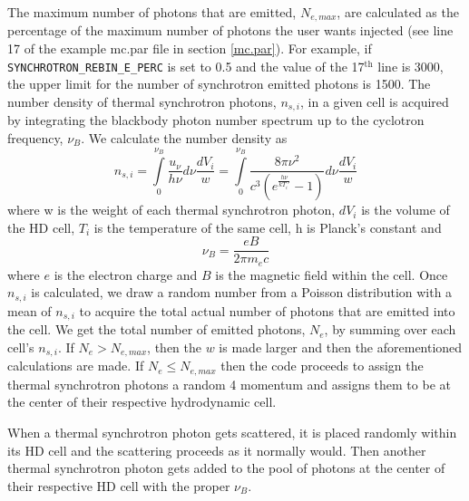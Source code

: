 \documentclass[12pt,a4paper]{article}
\begin{document}
The maximum number of photons that are emitted, $N_{e,max}$, are calculated as the percentage of the maximum number of photons the user wants injected (see line 17 of the example mc.par file in section \ref{mc.par}). For example, if \texttt{SYNCHROTRON\_REBIN\_E\_PERC} is set to 0.5 and the value of the 17$^\textrm{th}$ line is 3000, the upper limit for the number of synchrotron emitted photons is 1500. The number density of thermal synchrotron photons, $n_{s,i}$, in a given cell is acquired by integrating the blackbody photon number spectrum up to the cyclotron frequency, $\nu_B$. We calculate the number density as
\begin{equation}
n_{s,i}=\int\limits_{0}^{\nu_B}\frac{u_\nu}{h \nu}d\nu\frac{dV_i}{w}=\int\limits_{0}^{\nu_B}\frac{8\pi \nu^2 }{c^3 (e^\frac{h\nu}{kT_i'}-1 )}d\nu\frac{dV_i}{w}
\end{equation}
 where w is the weight of each thermal synchrotron photon, $dV_i$ is the volume of the HD cell, $T_i$ is the temperature of the same cell, h is Planck's constant and 
\begin{equation}
\nu_B=\frac{eB}{2\pi m_e c}
\end{equation}
where $e$ is the electron charge and $B$ is the magnetic field within the cell. Once $n_{s,i}$ is calculated, we draw a random number from a Poisson distribution with a mean of $n_{s,i}$ to acquire the total actual number of photons that are emitted into the cell. We get the total number of emitted photons, $N_e$, by summing over each cell's $n_{s,i}$. If $N_e > N_{e,max}$, then the $w$ is made larger and then the aforementioned calculations are made. If $N_e \le N_{e,max}$ then the code proceeds to assign the thermal synchrotron photons a random 4 momentum and assigns them to be at the center of their respective hydrodynamic cell.

When a thermal synchrotron photon gets scattered, it is placed randomly within its HD cell and the scattering proceeds as it normally would. Then another thermal synchrotron photon gets added to the pool of photons at the center of their respective HD cell with the proper $\nu_B$.
\end{document}
